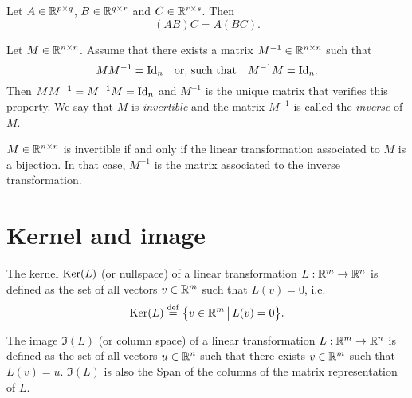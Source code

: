 \documentclass[11pt,nocut]{article}
\begin{document}

\begin{proposition}
	Let $A \in \mathbb{R}^{p \times q}$, $B \in \mathbb{R}^{q \times r}$ and $C \in \mathbb{R}^{r \times s}$. Then
	$$
	(AB) C = A (BC).
	$$
\end{proposition}

\begin{proposition}\label{prop:matrix_inverse}
	Let $M \in \mathbb{R}^{n \times n}$. Assume that there exists a matrix $M^{-1} \in \mathbb{R}^{n \times n}$ such that 
	$$
	M M^{-1} = {{\rm Id}}_n \quad \text{or, such that} \quad M^{-1} M = {{\rm Id}}_n.
	$$
	Then $M M^{-1} = M^{-1} M = {{\rm Id}}_n$ and $M^{-1}$ is the unique matrix that verifies this property.
	We say that $M$ is \emph{invertible} and the matrix $M^{-1}$ is called the \emph{inverse} of $M$.
\end{proposition}

\begin{remark}
	$M \in \mathbb{R}^{n \times n}$ is invertible if and only if the linear transformation associated to $M$ is a bijection. In that case, $M^{-1}$ is the matrix associated to the inverse transformation.
\end{remark}

\section{Kernel and image}

\begin{definition}[Kernel]
	The kernel ${{\rm Ker}}(L)$ (or nullspace) of a linear transformation $L: \mathbb{R}^m \to \mathbb{R}^n$ is defined as the set of all vectors $v \in \mathbb{R}^m$ such that $L(v) = 0$, i.e.
	$$
	{{\rm Ker}}(L) \overset{\rm def}{=} \big\{ v \in \mathbb{R}^m \, \big| \, L(v) = 0 \big\}.
	$$
\end{definition}

\begin{definition}[Image]
	The image $\Im(L)$ (or column space) of a linear transformation $L: \mathbb{R}^m \to \mathbb{R}^n$ is defined as the set of all vectors $u \in \mathbb{R}^n$ such that there exists $v \in \mathbb{R}^m$ such that $L(v) = u$. 
	$\Im(L)$ is also the Span of the columns of the matrix representation of $L$.
\end{definition}
\end{document}
